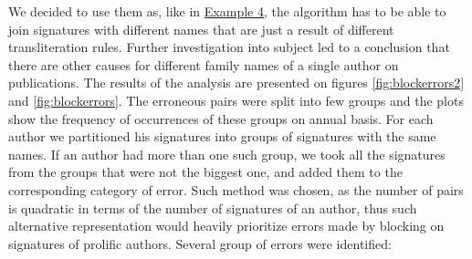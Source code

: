 \documentclass{pracamgr}
\begin{document}
We decided to use them as, like in \hyperref[ex4]{Example 4}, the algorithm has to
be able to join signatures with different names that are just a result of different
transliteration rules. Further investigation into subject led to a conclusion that there
are other causes for different family names of a single author on publications.
The results of the analysis are presented on figures \ref{fig:blockerrors2} and
\ref{fig:blockerrors}. The erroneous pairs were split into few groups and the plots
show the frequency of occurrences of these groups on annual basis. For each author
we partitioned his signatures into groups of signatures with the same names. If an
author had more than one such group, we took all the signatures from the groups that
were not the biggest one, and added them to the corresponding category of error.
Such method was chosen, as the number of pairs is quadratic in terms of the number
of signatures of an author, thus such alternative representation would 
heavily prioritize errors made by blocking on signatures of prolific authors.
Several group of errors were identified:
\end{document}
